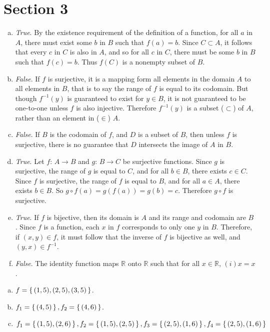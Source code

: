 \documentclass[12pt]{scrartcl} %
\begin{document}
\section{Section 3}


\begin{enumerate}[(a)]
\item \emph{True}. By the existence requirement of the definition of a function, for all $a$ in $A$, there must exist some $b$ in $B$ such that $f(a) = b$. Since $C \subset A$, it follows that every $c$ in $C$ is also in $A$, and so for all $c$ in $C$, there must be some $b$ in $B$ such that $f(c) = b$. Thus $f(C)$ is a nonempty subset of $B$.
\item \emph{False}. If $f$ is surjective, it is a mapping form all elements in the domain $A$ to all elements in $B$, that is to say the range of $f$ is equal to its codomain. But though $f^{-1}(y)$ is guaranteed to exist for $y \in B$, it is not guaranteed to be one-to-one unless $f$ is also injective. Therefore $f^{-1}(y)$ is a subset ($\subset$) of $A$, rather than an element in ($\in$) $A$.
\item \emph{False}. If $B$ is the codomain of $f$, and $D$ is a subset of $B$, then unless $f$ is surjective, there is no guarantee that $D$ intersects the image of $A$ in $B$.
\item \emph{True}. Let $f: \, A \rightarrow B$ and $g: \, B \rightarrow C$ be surjective functions. Since $g$ is surjective, the range of $g$ is equal to $C$, and for all $b \in B$, there exists $c \in C$. Since $f$ is surjective, the range of $f$ is equal to $B$, and for all $a \in A$, there exists $b \in B$. So $g \circ f(a)= g(f(a)) = g(b) =c$. Therefore $g \circ f$ is surjective.
\item \emph{True}. If $f$ is bijective, then its domain is $A$ and its range and codomain are $B$. Since $f$ is a function, each $x$ in $f$ corresponds to only one $y$ in $B$. Therefore, if $(x,y) \in f$, it must follow that the inverse of $f$ is bijective as well, and $(y,x) \in f^{-1}$.
\item \emph{False}. The identity function maps $\mathbb{R}$ onto $\mathbb{R}$ such that for all $x \in \mathbb{R}$, $(i)x = x$.
\end{enumerate}

\begin{enumerate}[(a)]
\item $ f = \set{(1,5), (2,5), (3,5)}$.
\item $ f_1 = \set{(4,5)}, f_2 = \set{(4,6)}$.
\item $ f_1 = \set{(1,5), (2,6)}, f_2 = \set{(1,5), (2,5)}, f_3=\set{(2,5),(1,6)}, f_4=\set{(2,5),(1,6)}$
\end{enumerate}
\end{document}
